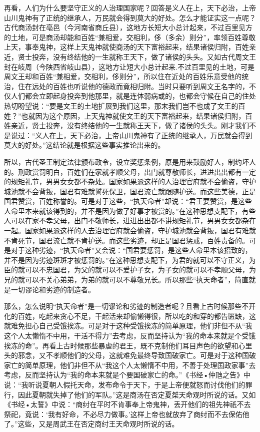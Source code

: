 \documentclass[a5paper,oneside,12pt]{ctexbook}
\begin{document}
{{再看，人们为什么要坚守正义的人治理国家呢？回答是义人在上，天下必治，上帝山川鬼神有了正统的继承人，万民就会得到莫大的好处。怎么才能证实这一点呢？古代商汤封在亳邑（今河南省商丘县），这地方长短大小总计起来，不过百里见方的土地，可是商汤却能和百姓“兼相爱，交相利，侈（多余）则分”，率领百姓尊敬上天，事奉鬼神，这样上天鬼神就使商汤的天下富裕起来，结果诸侯归附，百姓亲近，贤士投奔，没有终结他的一生就称王天下，做了诸侯的头头。又如古代周文王封在岐周（今陕西省岐山县），这地方让短大小总计起来.不过百里见的土地，可是周文王却和百姓“兼相爱，交相利，侈则分”，所以住在近处的百姓乐意受他的统治，住在远处的百姓也听说他的德政而竟相归附。当时只要听到周文王名字的，不仅人们都会立即起身投奔到他那里，就是连体弱病或的，也都会守候在自己的住处热切盼望说：“要是文王的土地扩展到我们这里，那末我们岂不也成了文王的百姓？”也就因为这个原因，上天鬼神就使文王的天下富裕起来，结果诸侯归附，百姓亲近，贤士投奔，没有终结他的一生就称王天下，做了诸侯的头头。刚才我们不是说过：“义人在上，天下必治，上帝山川鬼神有了正统的继承人，万民就会得到莫大的好处。”这结论就是根据这些事实推论出来的。

所以，古代圣王制定法律颁布政令，设立奖惩条例，原是用来鼓励好人，制约坏人的。刑政赏罚明白，百姓们在家就孝顺父母，出门就尊敬师长，进进出出都有一定的规矩礼节，男男女女都不杂处。国家如果派这样的人治理官府就不会偷盗，守护城池就不会背叛，国君有难就誓死保卫，国君流亡就跟随护送。而这些美德，正是国君赞赏，百姓称誉的。可是对于这些，“执天命者”却说：“君王要赞赏，是这些人命里本来就该得到的，并不是因为做了好事才被赏的。”在这种思想支配下，有些人可以在家不孝父母，出门不敬师长，进进出出都不讲规矩礼节，男男女女都杂在一起。国家如果派这样的人去治理官府就会偷盗，守护城池就会背叛，国君有难就不肯死节，国君流亡就不肯护送。而这些劣迹，却正是国君惩戒，百姓责备的。可是对于这种劣迹，“执天命者”又会说：“国君要惩罚，是这些人命里本该招致的，并不是因为劣迹斑斑才被惩罚的。”在这种思想支配下，为君的就可以不守正义，为臣的就可以不忠国君，为父的就可以不爱护子女，为子女的就可以不孝顺父母，为兄的就可以不关心弟弟，为弟的就可以不尊敬兄长。所以那些“执天命者”，简直就是一切谬论和劣迹的制造者。

那么，怎么说明“执天命者”是一切谬论和劣迹的制造者呢？且看上古时候那些不开化的百姓，吃起来贪心不足，干起活来却偷懒得很，所以吃的和穿的都告匮缺，这就难免担心自己受饿挨冻。可是对于这种受饿挨冻的简单原理，他们非但不从“我这个人太懒惰不中用，干活不得力”去考虑，反而坚持认为“我的命本来就是个受饿挨冻的命”。再看上古时候那些暴虐的君王，既不克制他们耳目声色的欲望和心里头的邪念，又不孝顺他们的父母，这就难免最终导致国破家亡。可是对于这种国破家亡的简单原理，他们非但不从“我这个人太懒惰不中用，不善于处理国政家事”去考虑，反而坚持认为“我的命本来就是个要国破家亡的命。”《书经•仲虺之告》中说：“我听说夏朝人假托天命，发布命令于天下，于是上帝便就怒而讨伐他们的罪行，因此夏朝就失掉了他们的军队。”这是商汤在否定夏桀天命观时所说的话。又如《书经•太誓》中说：“商纣在平时不肯事奉上帝鬼神，丢开他们的祖先神祇不去祭祀，竟说：‘我有好命，不必尽力做事。’这样上帝也就放弃了商纣而不去保佑他了。”这些，又是周武王在否定商纣王天命观时所说的话。

}}
\end{document}
